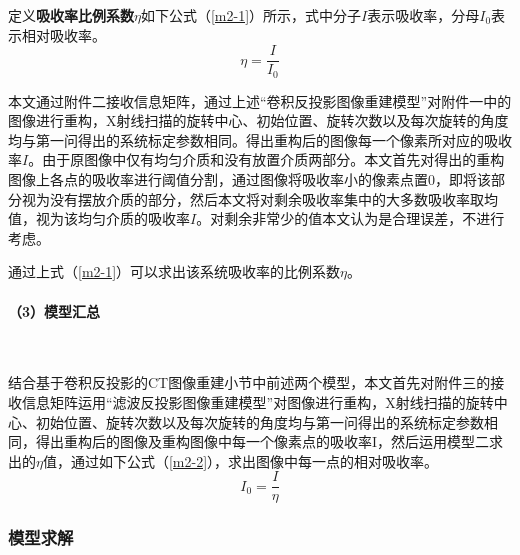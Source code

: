 \documentclass[withoutpreface,bwprint]{cumcmthesis} %
\begin{document}
定义\textbf{吸收率比例系数$\eta$}如下公式（\ref{m2-1}）所示，式中分子$I$表示吸收率，分母$I_0$表示相对吸收率。
\begin{equation}
	\label{m2-1}
	\eta = \frac{I}{I_0}
\end{equation}  

\par 本文通过附件二接收信息矩阵，通过上述“卷积反投影图像重建模型”对附件一中的图像进行重构，X射线扫描的旋转中心、初始位置、旋转次数以及每次旋转的角度均与第一问得出的系统标定参数相同。得出重构后的图像每一个像素所对应的吸收率$I$。由于原图像中仅有均匀介质和没有放置介质两部分。本文首先对得出的重构图像上各点的吸收率进行阈值分割，通过图像将吸收率小的像素点置0，即将该部分视为没有摆放介质的部分，然后本文将对剩余吸收率集中的大多数吸收率取均值，视为该均匀介质的吸收率$I$。对剩余非常少的值本文认为是合理误差，不进行考虑。

通过上式（\ref{m2-1}）可以求出该系统吸收率的比例系数$\eta$。

\paragraph*{（3）模型汇总}~\\

\par 结合基于卷积反投影的CT图像重建小节中前述两个模型，本文首先对附件三的接收信息矩阵运用“滤波反投影图像重建模型”对图像进行重构，X射线扫描的旋转中心、初始位置、旋转次数以及每次旋转的角度均与第一问得出的系统标定参数相同，得出重构后的图像及重构图像中每一个像素点的吸收率I，然后运用模型二求出的$\eta$值，通过如下公式（\ref{m2-2}），求出图像中每一点的相对吸收率。
\begin{equation}
	\label{m2-2}
	I_0 = \frac{I}{\eta}
\end{equation}


\subsubsection{模型求解}
\end{document}
